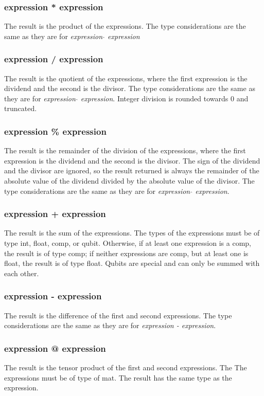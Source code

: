 \subsubsection{expression * expression}
The result is the product of the expressions. The type considerations are the same as they are for \textit{expression $\hat{}$ expression}
\subsubsection{expression / expression}
The result is the quotient of the expressions, where the first expression is the dividend and the second is the divisor. The type considerations are the same as they are for \textit{expression $\hat{}$ expression}. Integer division is rounded towards 0 and truncated.
\subsubsection{expression \% expression}
The result is the remainder of the division of the expressions, where the first expression is the dividend and the second is the divisor. The sign of the dividend and the divisor are ignored, so the result returned is always the remainder of the absolute value of the dividend divided by the absolute value of the divisor. The type considerations are the same as they are for \textit{expression $\hat{}$ expression}.
\subsubsection{expression + expression}
The result is the sum of the expressions. The types of the expressions must be of type int, float, comp, or qubit. Otherwise, if at least one expression is a comp, the result is of type comp; if neither expressions are comp, but at least one is float, the result is of type float. Qubits are special and can only be summed with each other.
\subsubsection{expression - expression}
The result is the difference of the first and second expressions. The type considerations are the same as they are for \textit{expression - expression}.
\subsubsection{expression @ expression}
The result is the tensor product of the first and second expressions. The The expressions must be of type of mat. The result has the same type as the expression.
